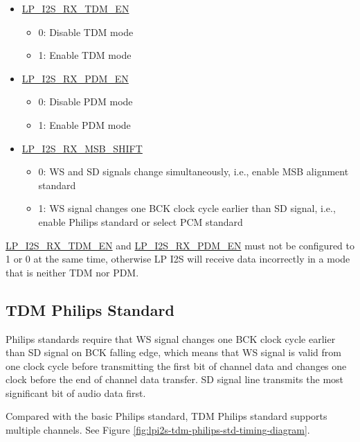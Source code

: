 \documentclass[main\_\_EN.tex]{subfiles}
\begin{document}
\begin{itemize}
    \item \hyperref[fielddesc:LPI2SRXTDMEN]{LP\_I2S\_RX\_TDM\_EN}
    \begin{itemize}
        \item 0: Disable TDM mode
        \item 1: Enable TDM mode
    \end{itemize}
    \item \hyperref[fielddesc:LPI2SRXPDMEN]{LP\_I2S\_RX\_PDM\_EN}
    \begin{itemize}
        \item 0: Disable PDM mode
        \item 1: Enable PDM mode
    \end{itemize}    
    \item \hyperref[fielddesc:LPI2SRXMSBSHIFT]{LP\_I2S\_RX\_MSB\_SHIFT}
    \begin{itemize}
        \item 0: WS and SD signals change simultaneously, i.e., enable MSB alignment standard
        \item 1: WS signal changes one BCK clock cycle earlier than SD signal, i.e., enable Philips standard or select PCM standard
    \end{itemize}
\end{itemize}

\begin{tiplisting}
\hyperref[fielddesc:LPI2SRXTDMEN]{LP\_I2S\_RX\_TDM\_EN} and \hyperref[fielddesc:LPI2SRXPDMEN]{LP\_I2S\_RX\_PDM\_EN} must not be configured to 1 or 0 at the same time, otherwise LP I2S will receive data incorrectly in a mode that is neither TDM nor PDM.
\end{tiplisting}

\subsection{TDM Philips Standard}

Philips standards require that WS signal changes one BCK clock cycle earlier than SD signal on BCK falling edge, which means that WS signal is valid from one clock cycle before transmitting the first bit of channel data and changes one clock before the end of channel data transfer. SD signal line transmits the most significant bit of audio data first. 

Compared with the basic Philips standard, TDM Philips standard supports multiple channels. See Figure \ref{fig:lpi2s-tdm-philips-std-timing-diagram}.
\end{document}
